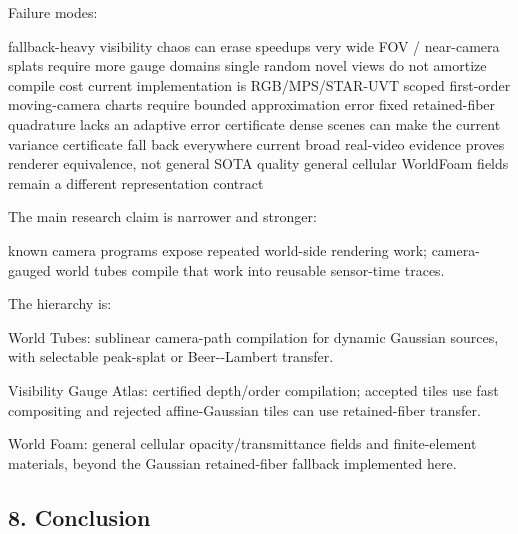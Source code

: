 \documentclass[
]{article}
\newenvironment{Shaded}{}{}
\newcommand{\NormalTok}[1]{#1}
\begin{document}
Failure modes:

\begin{Shaded}
\begin{Highlighting}[]
\NormalTok{fallback{-}heavy visibility chaos can erase speedups}
\NormalTok{very wide FOV / near{-}camera splats require more gauge domains}
\NormalTok{single random novel views do not amortize compile cost}
\NormalTok{current implementation is RGB/MPS/STAR{-}UVT scoped}
\NormalTok{first{-}order moving{-}camera charts require bounded approximation error}
\NormalTok{fixed retained{-}fiber quadrature lacks an adaptive error certificate}
\NormalTok{dense scenes can make the current variance certificate fall back everywhere}
\NormalTok{current broad real{-}video evidence proves renderer equivalence, not general SOTA quality}
\NormalTok{general cellular WorldFoam fields remain a different representation contract}
\end{Highlighting}
\end{Shaded}

The main research claim is narrower and stronger:

\begin{Shaded}
\begin{Highlighting}[]
\NormalTok{known camera programs expose repeated world{-}side rendering work;}
\NormalTok{camera{-}gauged world tubes compile that work into reusable sensor{-}time traces.}
\end{Highlighting}
\end{Shaded}

The hierarchy is:

\begin{Shaded}
\begin{Highlighting}[]
\NormalTok{World Tubes:}
\NormalTok{  sublinear camera{-}path compilation for dynamic Gaussian sources, with}
\NormalTok{  selectable peak{-}splat or Beer{-}{-}Lambert transfer.}

\NormalTok{Visibility Gauge Atlas:}
\NormalTok{  certified depth/order compilation; accepted tiles use fast compositing and}
\NormalTok{  rejected affine{-}Gaussian tiles can use retained{-}fiber transfer.}

\NormalTok{World Foam:}
\NormalTok{  general cellular opacity/transmittance fields and finite{-}element materials,}
\NormalTok{  beyond the Gaussian retained{-}fiber fallback implemented here.}
\end{Highlighting}
\end{Shaded}

\subsection{8. Conclusion}\label{conclusion}
\end{document}
